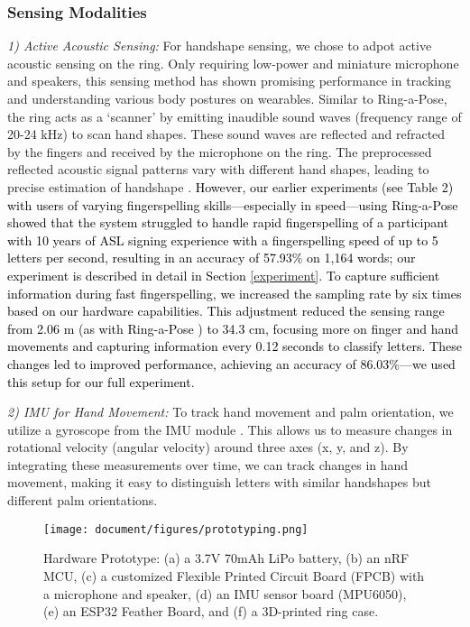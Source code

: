 \subsubsection{Sensing Modalities} \textit{1) Active Acoustic Sensing:} For handshape sensing, we chose to adpot active acoustic sensing on the ring. Only requiring low-power and miniature microphone and speakers, this sensing method has shown promising performance in tracking and understanding various body postures on wearables\cite{yu2024ring,li2022eario,li2024eyeecho,li2024gazetrak,mahmud2023posesonic,li2024sonicid,mahmud2024actsonic,mahmud2024munchsonic,sun2023echonose,lee2024echowrist,zhang2023echospeech,mahmud2024wristsonic,zhang2023hpspeech,parikh2024echoguide}. Similar to Ring-a-Pose\cite{yu2024ring}, the ring acts as a `scanner' by emitting inaudible sound waves (frequency range of 20-24 kHz) to scan hand shapes. These sound waves are reflected and refracted by the fingers and received by the microphone on the ring. The preprocessed reflected acoustic signal patterns vary with different hand shapes, leading to precise estimation of handshape \cite{yu2024ring}. \textcolor{black}{However, our earlier experiments (see Table 2) with users of varying fingerspelling skills—especially in speed—using Ring-a-Pose showed that the system struggled to handle rapid fingerspelling of a participant with 10 years of ASL signing experience with a fingerspelling speed of up to 5 letters per second, resulting in an accuracy of 57.93\% on 1,164 words; our experiment is described in detail in Section \ref{experiment}. To capture sufficient information during fast fingerspelling, we increased the sampling rate by six times based on our hardware capabilities. This adjustment reduced the sensing range from 2.06 m (as with Ring-a-Pose \cite{yu2024ring}) to 34.3 cm, focusing more on finger and hand movements and capturing information every 0.12 seconds to classify letters. These changes led to improved performance, achieving an accuracy of 86.03\%---we used this setup for our full experiment.}



\textit{2) IMU for Hand Movement:} To track hand movement and palm orientation, we utilize a gyroscope from the IMU module \cite{zhang2017fingersound,zhang2017fingorbits}. This allows us to measure changes in rotational velocity (angular velocity) around three axes (x, y, and z). By integrating these measurements over time, we can track changes in hand movement, making it easy to distinguish letters with similar handshapes but different palm orientations.
\begin{figure}[b!]
  \texttt{[image: document/figures/prototyping.png]}
  \caption{Hardware Prototype: (a) a 3.7V 70mAh LiPo battery, (b) an nRF MCU, (c) a customized Flexible Printed Circuit Board (FPCB) with a microphone and speaker, (d) an IMU sensor board (MPU6050), (e) an ESP32 Feather Board, and (f) a 3D-printed ring case.}
  \label{fig:prototype}
\end{figure}

